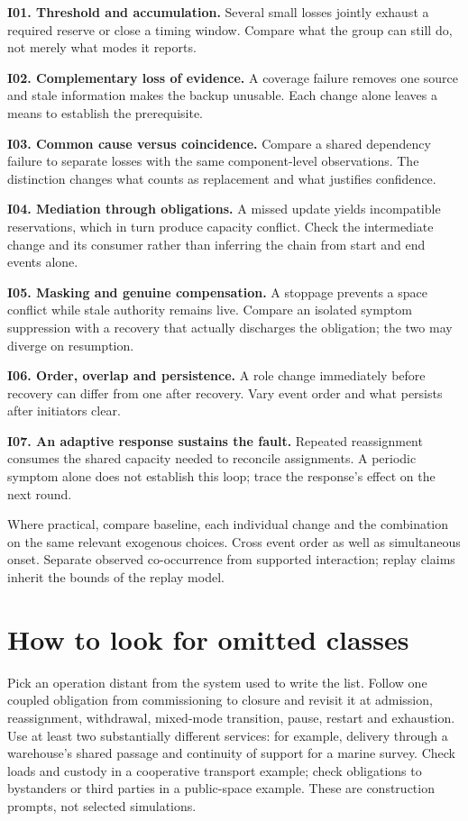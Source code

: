 \documentclass[11pt]{article}
\newcommand{\entry}[3]{\par\smallskip\noindent\textbf{#1. #2.} #3\par}
\begin{document}
\entry{I01}{Threshold and accumulation}{Several small losses jointly exhaust a required reserve or close a timing window. Compare what the group can still do, not merely what modes it reports.}
\entry{I02}{Complementary loss of evidence}{A coverage failure removes one source and stale information makes the backup unusable. Each change alone leaves a means to establish the prerequisite.}
\entry{I03}{Common cause versus coincidence}{Compare a shared dependency failure to separate losses with the same component-level observations. The distinction changes what counts as replacement and what justifies confidence.}
\entry{I04}{Mediation through obligations}{A missed update yields incompatible reservations, which in turn produce capacity conflict. Check the intermediate change and its consumer rather than inferring the chain from start and end events alone.}
\entry{I05}{Masking and genuine compensation}{A stoppage prevents a space conflict while stale authority remains live. Compare an isolated symptom suppression with a recovery that actually discharges the obligation; the two may diverge on resumption.}
\entry{I06}{Order, overlap and persistence}{A role change immediately before recovery can differ from one after recovery. Vary event order and what persists after initiators clear.}
\entry{I07}{An adaptive response sustains the fault}{Repeated reassignment consumes the shared capacity needed to reconcile assignments. A periodic symptom alone does not establish this loop; trace the response's effect on the next round.}

Where practical, compare baseline, each individual change and the combination on the same relevant exogenous choices. Cross event order as well as simultaneous onset. Separate observed co-occurrence from supported interaction; replay claims inherit the bounds of the replay model.

\section{How to look for omitted classes}
Pick an operation distant from the system used to write the list. Follow one coupled obligation from commissioning to closure and revisit it at admission, reassignment, withdrawal, mixed-mode transition, pause, restart and exhaustion. Use at least two substantially different services: for example, delivery through a warehouse's shared passage and continuity of support for a marine survey. Check loads and custody in a cooperative transport example; check obligations to bystanders or third parties in a public-space example. These are construction prompts, not selected simulations.
\end{document}
